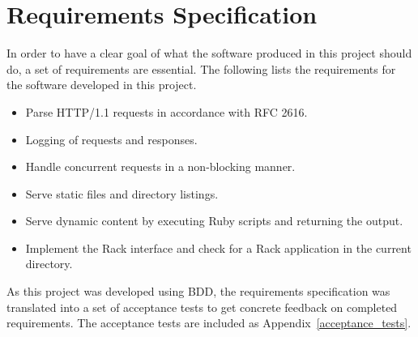 \section{Requirements Specification}
In order to have a clear goal of what the software produced in this project
should do, a set of requirements are essential. The following lists the
requirements for the software developed in this project.

\begin{itemize}
  \item Parse HTTP/1.1 requests in accordance with RFC 2616.
  \item Logging of requests and responses.
  \item Handle concurrent requests in a non-blocking manner.
  \item Serve static files and directory listings.
  \item Serve dynamic content by executing Ruby scripts and returning the
  output.
  \item Implement the Rack interface and check for a Rack application in the
  current directory.
\end{itemize}

As this project was developed using BDD, the requirements specification was
translated into a set of acceptance tests to get concrete feedback on
completed requirements. The acceptance tests are included as
Appendix~\ref{acceptance_tests}.
